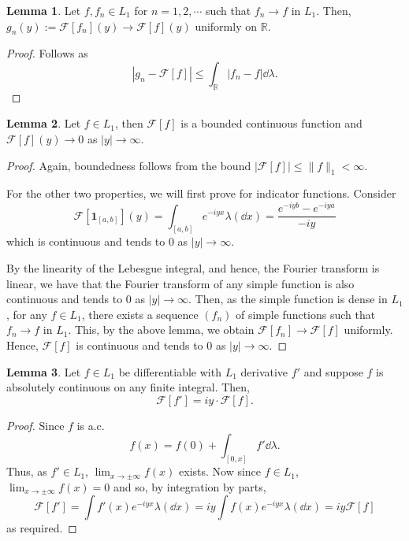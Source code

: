\documentclass[]{article}
\theoremstyle{definition}
\theoremstyle{definition}
\newtheorem{lemma}{Lemma}[section]
\begin{document}
\begin{lemma}
  Let \(f, f_n \in L_1\) for \(n = 1, 2, \cdots\) such that \(f_n \to f\) in \(L_1\). 
  Then, \(g_n(y) := \mathcal{F}[f_n](y) \to \mathcal{F}[f](y)\) uniformly on \(\mathbb{R}\).
\end{lemma}
\begin{proof}
  Follows as 
  \[|g_n - \mathcal{F}[f]| \le \int_{\mathbb{R}} |f_n - f| \dd \lambda.\]
\end{proof}

\begin{lemma}
  Let \(f \in L_1\), then \(\mathcal{F}[f]\) is a bounded continuous function and 
  \(\mathcal{F}[f](y) \to 0\) as \(|y| \to \infty\). 
\end{lemma}
\begin{proof}
  Again, boundedness follows from the bound \(|\mathcal{F}[f]| \le \|f\|_1 < \infty\).

  For the other two properties, we will first prove for indicator functions.
  Consider 
  \[\mathcal{F}[\mathbf{1}_{[a, b]}](y) = \int_{[a, b]} e^{-iy x} \lambda(\dd x) 
    = \frac{e^{-i yb} - e^{-iy a}}{-iy}\]
  which is continuous and tends to 0 as \(|y| \to \infty\).
  
  By the linearity of the Lebesgue integral, and hence, the Fourier transform is 
  linear, we have that the Fourier transform of any simple function is also 
  continuous and tends to 0 as \(|y| \to \infty\). Then, as the simple function 
  is dense in \(L_1\), for any \(f \in L_1\), there exists a sequence \((f_n)\) of 
  simple functions such that \(f_n \to f\) in \(L_1\). This, by the above lemma, 
  we obtain \(\mathcal{F}[f_n] \to \mathcal{F}[f]\) uniformly. Hence, 
  \(\mathcal{F}[f]\) is continuous and tends to 0 as \(|y| \to \infty\).
\end{proof}

\begin{lemma}
  Let \(f \in L_1\) be differentiable with \(L_1\) derivative \(f'\) and suppose 
  \(f\) is absolutely continuous on any finite integral. Then, 
  \[\mathcal{F}[f'] = iy \cdot \mathcal{F}[f].\] 
\end{lemma}
\begin{proof}
  Since \(f\) is a.c. 
  \[f(x) = f(0) + \int_{[0, x]} f' \dd \lambda.\]
  Thus, as \(f' \in L_1\), \(\lim_{x \to \pm \infty} f(x)\) exists. Now since 
  \(f \in L_1\), \(\lim_{x \to \pm \infty} f(x) = 0\) and so, by integration by 
  parts, 
  \[\mathcal{F}[f'] = \int f'(x)e^{-iyx} \lambda(\dd x) = 
    iy \int f(x)e^{-iy x} \lambda(\dd x) = iy \mathcal{F}[f]\]
  as required.
\end{proof}
\end{document}
